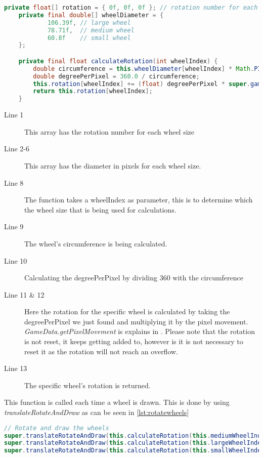 \begin{lstlisting}[language=java,firstnumber=1,caption={Rotating and drawing the wheels},label=lst:calcrotate]
    private float[] rotation = { 0f, 0f, 0f }; // rotation number for each wheel size
    private final double[] wheelDiameter = {
            106.39f, // large wheel
            78.71f,  // medium wheel
            60.8f    // small wheel
    };

    private final float calculateRotation(int wheelIndex) {    
        double circumference = this.wheelDiameter[wheelIndex] * Math.PI;
        double degreePerPixel = 360.0 / circumference;
        this.rotation[wheelIndex] += (float) degreePerPixel * super.gameData.getPixelMovement();
        return this.rotation[wheelIndex];
    }
\end{lstlisting}

\begin{description}
\item[Line 1] This array has the rotation number for each wheel size
\item[Line 2-6] This array has the diameter in pixels for each wheel size. 
\item[Line 8] The function takes a wheelIndex as parameter, this is to determine which the wheel size that is being used for calculations. 
\item[Line 9] The wheel's circumference is being calculated.
\item[Line 10] Calculating the degreePerPixel by dividing 360 with the circumference
\item[Line 11 \& 12] Here the rotation for the specific wheel is calculated by taking the degreePerPixel we just found and multiplying it by the pixel movement. \textit{GameData.getPixelMovement} is explains in . Please note that the rotation is not reset, it keeps getting added to, however is it is not necessary to reset it as the rotation will not reach an overflow.
\item[Line 13] The specific wheel's rotation is returned. 
\end{description}

This function is called each time a wheel is drawn. This is done by using \textit{translateRotateAndDraw} as can be seen in \autoref{lst:rotatewheels}

\begin{lstlisting}[language=java,firstnumber=1,caption={Rotating and drawing the wheels},label=lst:rotatewheels]
	// Rotate and draw the wheels
super.translateRotateAndDraw(this.calculateRotation(this.mediumWheelIndex), this.mediumWheel);
super.translateRotateAndDraw(this.calculateRotation(this.largeWheelIndex), this.largeWheel);
super.translateRotateAndDraw(this.calculateRotation(this.smallWheelIndex), this.smallWheel);
\end{lstlisting}

